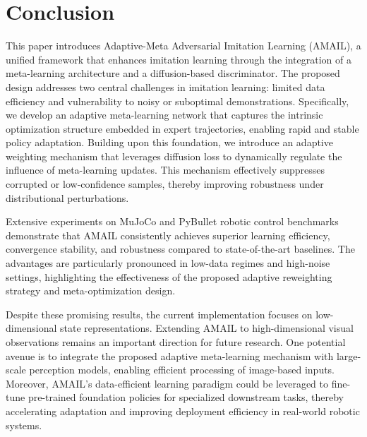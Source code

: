 \documentclass[lettersize,journal]{IEEEtran}
\begin{document}
\section{Conclusion}
This paper introduces Adaptive-Meta Adversarial Imitation Learning (AMAIL), a unified framework that enhances imitation learning through the integration of a meta-learning architecture and a diffusion-based discriminator. The proposed design addresses two central challenges in imitation learning: limited data efficiency and vulnerability to noisy or suboptimal demonstrations. Specifically, we develop an adaptive meta-learning network that captures the intrinsic optimization structure embedded in expert trajectories, enabling rapid and stable policy adaptation. Building upon this foundation, we introduce an adaptive weighting mechanism that leverages diffusion loss to dynamically regulate the influence of meta-learning updates. This mechanism effectively suppresses corrupted or low-confidence samples, thereby improving robustness under distributional perturbations.

Extensive experiments on MuJoCo and PyBullet robotic control benchmarks demonstrate that AMAIL consistently achieves superior learning efficiency, convergence stability, and robustness compared to state-of-the-art baselines. The advantages are particularly pronounced in low-data regimes and high-noise settings, highlighting the effectiveness of the proposed adaptive reweighting strategy and meta-optimization design.

Despite these promising results, the current implementation focuses on low-dimensional state representations. Extending AMAIL to high-dimensional visual observations remains an important direction for future research. One potential avenue is to integrate the proposed adaptive meta-learning mechanism with large-scale perception models, enabling efficient processing of image-based inputs. Moreover, AMAIL's data-efficient learning paradigm could be leveraged to fine-tune pre-trained foundation policies for specialized downstream tasks, thereby accelerating adaptation and improving deployment efficiency in real-world robotic systems.
\end{document}
